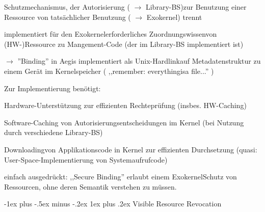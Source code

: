 \documentclass[a4paper]{article}
\makeatletter
\renewcommand{\subsubsection}{\@startsection{subsubsection}{3}{0mm}%
 {-1ex plus -.5ex minus -.2ex}%
 {1ex plus .2ex}%
 {\normalfont\small\bfseries}}
\makeatother
\begin{document}
\begin{multicols}{3}
    \begin{itemize*}
        \item
        Schutzmechanismus, der Autorisierung ( $\rightarrow$
        Library-BS)zur Benutzung einer Ressource von tatsächlicher Benutzung
        ( $\rightarrow$ Exokernel) trennt
        \item
        implementiert für den Exokernelerforderliches Zuordnungswissenvon
        (HW-)Ressource zu Mangement-Code (der im Library-BS implementiert ist)
        \item
        $\rightarrow$ ''Binding'' in Aegis implementiert als
        Unix-Hardlinkauf Metadatenstruktur zu einem Gerät im Kernelspeicher (
        ,,remember: everythingisa file...'' )
        \item
        Zur Implementierung benötigt:
        \begin{itemize*}
            \item Hardware-Unterstützung zur effizienten Rechteprüfung (insbes. HW-Caching)
            \item Software-Caching von Autorisierungsentscheidungen im Kernel (bei Nutzung durch verschiedene Library-BS)
            \item Downloadingvon Applikationscode in Kernel zur effizienten Durchsetzung (quasi: User-Space-Implementierung von Systemaufrufcode)
        \end{itemize*}
        \item
        einfach ausgedrückt: ,,Secure Binding'' erlaubt einem ExokernelSchutz
        von Ressourcen, ohne deren Semantik verstehen zu müssen.
    \end{itemize*}


    \subsubsection{Visible Resource
        Revocation}


\end{multicols}
\end{document}
